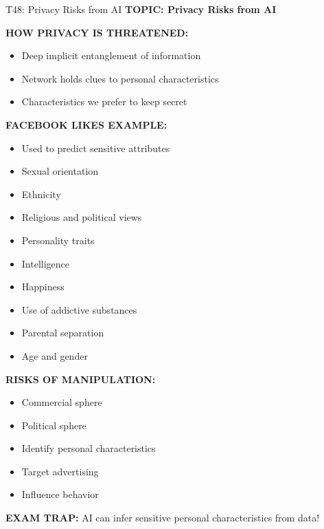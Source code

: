 \documentclass[8pt]{beamer}
\begin{document}
	\begin{frame}{T48: Privacy Risks from AI}
		\fontsize{6.5}{7.5}\selectfont
		\textbf{TOPIC: Privacy Risks from AI}
		
		\vspace{0.1cm}
		\textbf{HOW PRIVACY IS THREATENED:}
		\begin{itemize}
			\item Deep implicit entanglement of information
			\item Network holds clues to personal characteristics
			\item Characteristics we prefer to keep secret
		\end{itemize}
		
		\vspace{0.1cm}
		\textbf{FACEBOOK LIKES EXAMPLE:}
		\begin{itemize}
			\item Used to predict sensitive attributes
			\item Sexual orientation
			\item Ethnicity
			\item Religious and political views
			\item Personality traits
			\item Intelligence
			\item Happiness
			\item Use of addictive substances
			\item Parental separation
			\item Age and gender
		\end{itemize}
		
		\vspace{0.1cm}
		\textbf{RISKS OF MANIPULATION:}
		\begin{itemize}
			\item Commercial sphere
			\item Political sphere
			\item Identify personal characteristics
			\item Target advertising
			\item Influence behavior
		\end{itemize}
		
		\textcolor{myred}{\textbf{EXAM TRAP:}} AI can \textcolor{myblue}{infer sensitive personal characteristics} from data!
	\end{frame}
	
\end{document}

